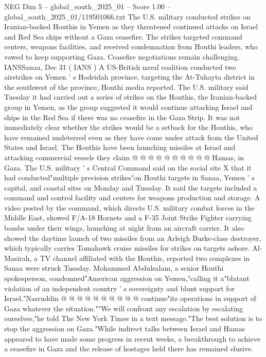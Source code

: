 \begin{textsample}{NEG Dim 5 – global\_south\_2025\_01 – Score 1.00 – global\_south\_2025\_01/119501066.txt}  \label{ex:f5_neg_155}
The U.S. military conducted strikes on Iranian-backed Houthis in Yemen as they threatened continued attacks on Israel and Red Sea ships without a Gaza ceasefire.
The strikes targeted command centers, weapons facilities, and received condemnation from Houthi leaders, who vowed to keep supporting Gaza.
Ceasefire negotiations remain challenging.
IANSSanaa, Dec 31 ( IANS ) A US-British naval coalition conducted two airstrikes on Yemen ' s Hodeidah province, targeting the At-Tuhayta district in the southwest of the province, Houthi media reported.
The U.S. military said Tuesday it had carried out a series of strikes on the Houthis, the Iranian-backed group in Yemen, as the group suggested it would continue attacking Israel and ships in the Red Sea if there was no ceasefire in the Gaza Strip.
It was not immediately clear whether the strikes would be a setback for the Houthis, who have remained undeterred even as they have come under attack from the United States and Israel.
The Houthis have been launching missiles at Israel and attacking commercial vessels they claim @ @ @ @ @ @ @ @ @ @ Hamas, in Gaza.
The U.S. military ' s Central Command said on the social site X that it had conducted"multiple precision strikes"on Houthi targets in Sanaa, Yemen ' s capital, and coastal sites on Monday and Tuesday.
It said the targets included a command and control facility and centers for weapons production and storage.
A video posted by the command, which directs U.S. military combat forces in the Middle East, showed F/A-18 Hornets and a F-35 Joint Strike Fighter carrying bombs under their wings, launching at night from an aircraft carrier.
It also showed the daytime launch of two missiles from an Arleigh Burke-class destroyer, which typically carries Tomahawk cruise missiles for strikes on targets ashore.
Al-Masirah, a TV channel affiliated with the Houthis, reported two complexes in Sanaa were struck Tuesday.
Mohammed Abdulsalam, a senior Houthi spokesperson, condemned"American aggression on Yemen,"calling it a"blatant violation of an independent country ' s sovereignty and blunt support for Israel."Nasruddin @ @ @ @ @ @ @ @ @ @ continue"its operations in support of Gaza whatever the situation.""We will confront any escalation by escalating ourselves,"he told The New York Times in a text message."The best solution is to stop the aggression on Gaza."While indirect talks between Israel and Hamas appeared to have made some progress in recent weeks, a breakthrough to achieve a ceasefire in Gaza and the release of hostages held there has remained elusive.

\end{textsample}
